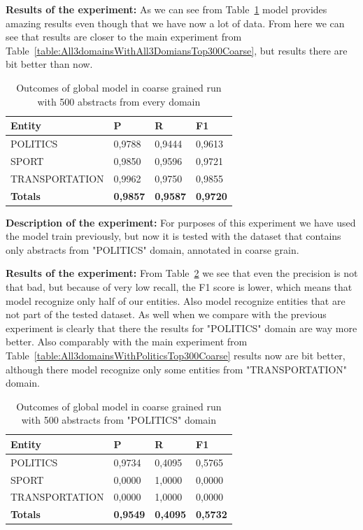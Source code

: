 \documentclass[thesis=M,english]{FITthesis}[2018/05/30]
\begin{document}
	\textbf{Results of the experiment:} As we can see from Table~\ref{table:500GlobalDomainWithAllAbstractsTop500Coarse} model provides amazing results even though that we have now a lot of data. From here we can see that results are closer to the main experiment from Table~\ref{table:All3domainsWithAll3DomiansTop300Coarse}, but results there are bit better than now. 

	\begin{table}[H]\centering
		\begin{tabular}{|l|l|l|l|}
			\hline {\textbf{Entity}} & {\textbf{P}} & {\textbf{R}} & {\textbf{F1}}\\\hline
				POLITICS & 0,9788 & 0,9444 & 0,9613\\
				SPORT & 0,9850 & 0,9596 & 0,9721\\
				TRANSPORTATION & 0,9962 & 0,9750 & 0,9855\\\hline
				\textbf{Totals} & \textbf{0,9857} & \textbf{0,9587} & \textbf{0,9720}\\\hline
		\end{tabular}
		\caption{Outcomes of global model in coarse grained run with 500 abstracts from every domain \label{table:500GlobalDomainWithAllAbstractsTop500Coarse}}
	\end{table}

\textbf{Description of the experiment:} For purposes of this experiment we have used the model train previously, but now it is tested with the dataset that contains only abstracts from "POLITICS" domain, annotated in coarse grain.

	\textbf{Results of the experiment:} From Table~\ref{table:500GlobalDomainWithPoliticsTop500Coarse} we see that even the precision is not that bad, but because of very low recall, the F1 score is lower, which means that model recognize only half of our entities. Also model recognize entities that are not part of the tested dataset. As well when we compare with the previous experiment is clearly that there the results for "POLITICS" domain are way more better. Also comparably with the main experiment from Table~\ref{table:All3domainsWithPoliticsTop300Coarse} results now are bit better, although there model recognize only some entities from "TRANSPORTATION" domain.

	\begin{table}[H]\centering
		\begin{tabular}{|l|l|l|l|}
			\hline {\textbf{Entity}} & {\textbf{P}} & {\textbf{R}} & {\textbf{F1}}\\\hline
				POLITICS & 0,9734 & 0,4095 & 0,5765\\
				SPORT & 0,0000 & 1,0000 & 0,0000\\
				TRANSPORTATION & 0,0000 & 1,0000 & 0,0000\\\hline
				\textbf{Totals} & \textbf{0,9549} & \textbf{0,4095} & \textbf{0,5732}\\\hline
		\end{tabular}
		\caption{Outcomes of global model in coarse grained run with 500 abstracts from "POLITICS" domain \label{table:500GlobalDomainWithPoliticsTop500Coarse}}
	\end{table}
\end{document}
